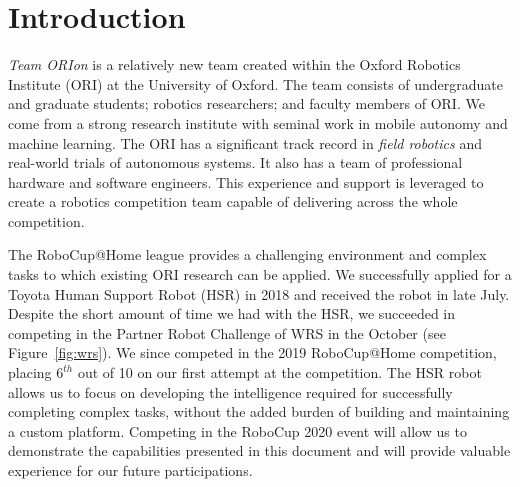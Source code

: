 \documentclass[runningheads,a4paper]{llncs}
\newcommand{\teamori}{Team ORIon}
\begin{document}

\section{Introduction}

\textit{\teamori{}} is a relatively new team created within the Oxford Robotics Institute
(ORI) at the University of Oxford. The team consists of undergraduate and
graduate students; robotics researchers; and faculty members of ORI. We come
from a strong research institute with seminal work in mobile autonomy and
machine learning. The ORI has a significant track record in \emph{field robotics}
and real-world trials of autonomous systems. It also has a team of professional
hardware and software engineers. This experience and support is leveraged
to create a robotics competition team capable of delivering across the whole
competition. 

The RoboCup@Home league provides a challenging environment and complex tasks to
which existing ORI research can be applied. 
We successfully applied for a Toyota Human Support Robot (HSR) in 2018
and received the robot in late July. Despite the short amount of time we
had with the HSR, we succeeded in competing in the Partner Robot Challenge of WRS in the October (see Figure~\ref{fig:wrs}). We since competed in the 2019 RoboCup@Home competition, placing $6^{th}$ out of 10 on our first attempt at the competition. 
The HSR robot allows us to focus on developing the
intelligence required for successfully completing complex tasks, 
without the added burden of building and maintaining a custom platform. 
Competing in the RoboCup 2020 event will allow us to demonstrate 
the capabilities presented in this document and will provide valuable experience
for our future participations.
\end{document}
